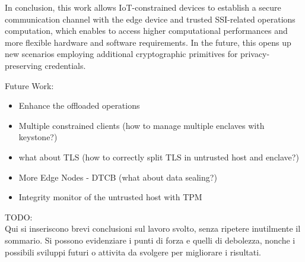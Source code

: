 
In conclusion, this work allows IoT-constrained devices to establish a secure communication channel with the edge device and trusted SSI-related operations computation, which enables to access higher computational performances and more flexible hardware and software requirements. In the future, this opens up new scenarios employing additional cryptographic primitives for privacy-preserving credentials. 

\color{red}
Future Work:
\begin{itemize}
    \item Enhance the offloaded operations
    \item Multiple constrained clients (how to manage multiple enclaves with keystone?)
    \item what about TLS (how to correctly split TLS in untrusted host and enclave?)
    \item More Edge Nodes - DTCB (what about data sealing?)
    \item Integrity monitor of the untrusted host with TPM 
\end{itemize}
TODO: \\
Qui si inseriscono brevi conclusioni sul lavoro svolto, senza ripetere inutilmente il sommario.
Si possono evidenziare i punti di forza e quelli di debolezza, nonche i possibili sviluppi futuri o attivita da svolgere per migliorare i risultati.

\color{black}